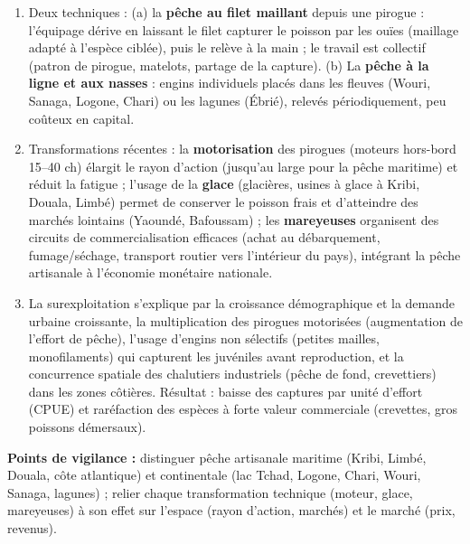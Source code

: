 \documentclass[11pt]{article}
\begin{document}
\begin{corrige}
\begin{enumerate}
\item Deux techniques : (a) la \textbf{pêche au filet maillant} depuis une pirogue : l'équipage dérive en laissant le filet capturer le poisson par les ouïes (maillage adapté à l'espèce ciblée), puis le relève à la main ; le travail est collectif (patron de pirogue, matelots, partage de la capture). (b) La \textbf{pêche à la ligne et aux nasses} : engins individuels placés dans les fleuves (Wouri, Sanaga, Logone, Chari) ou les lagunes (Ébrié), relevés périodiquement, peu coûteux en capital.
\item Transformations récentes : la \textbf{motorisation} des pirogues (moteurs hors-bord 15–40 ch) élargit le rayon d'action (jusqu'au large pour la pêche maritime) et réduit la fatigue ; l'usage de la \textbf{glace} (glacières, usines à glace à Kribi, Douala, Limbé) permet de conserver le poisson frais et d'atteindre des marchés lointains (Yaoundé, Bafoussam) ; les \textbf{mareyeuses} organisent des circuits de commercialisation efficaces (achat au débarquement, fumage/séchage, transport routier vers l'intérieur du pays), intégrant la pêche artisanale à l'économie monétaire nationale.
\item La surexploitation s'explique par la croissance démographique et la demande urbaine croissante, la multiplication des pirogues motorisées (augmentation de l'effort de pêche), l'usage d'engins non sélectifs (petites mailles, monofilaments) qui capturent les juvéniles avant reproduction, et la concurrence spatiale des chalutiers industriels (pêche de fond, crevettiers) dans les zones côtières. Résultat : baisse des captures par unité d'effort (CPUE) et raréfaction des espèces à forte valeur commerciale (crevettes, gros poissons démersaux).
\end{enumerate}
\textbf{Points de vigilance :} distinguer pêche artisanale maritime (Kribi, Limbé, Douala, côte atlantique) et continentale (lac Tchad, Logone, Chari, Wouri, Sanaga, lagunes) ; relier chaque transformation technique (moteur, glace, mareyeuses) à son effet sur l'espace (rayon d'action, marchés) et le marché (prix, revenus).
\end{corrige}
\end{document}
